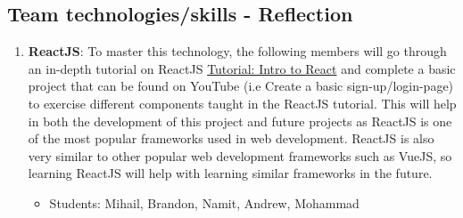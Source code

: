 \documentclass{article}
\begin{document}
\subsection{Team technologies/skills - Reflection  }
\begin{enumerate}
    \item \textbf{ReactJS}: To master this technology, the following members will go through an in-depth tutorial on ReactJS \href{https://reactjs.org/tutorial/tutorial.html}{Tutorial: Intro to React} and complete a basic project that can be found on YouTube (i.e Create a basic sign-up/login-page) to exercise different components taught in the ReactJS tutorial. This will help in both the development of this project and future projects as ReactJS is one of the most popular frameworks used in web development. ReactJS is also very similar to other popular web development frameworks such as VueJS, so learning ReactJS will help with learning similar frameworks in the future.
        \begin{itemize}
            \item Students: Mihail, Brandon, Namit, Andrew, Mohammad
        \end{itemize}
    

\end{enumerate}
\end{document}
